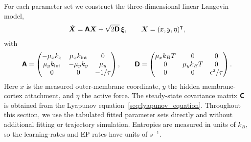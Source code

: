 For each parameter set we construct the three-dimensional linear Langevin model,
\[
\dot{\bm X} = \boldsymbol{\mathsf{A}} \bm X + \sqrt{2\boldsymbol{\mathsf{D}}}\,\bm\xi, \qquad \bm X = (x,y,\eta)^\intercal,
\]
with
\[
\boldsymbol{\mathsf{A}} =
\begin{pmatrix}
-\mu_x k_x & \mu_x k_{\rm int} & 0 \\
\mu_y k_{\rm int} & -\mu_y k_y & \mu_y \\
0 & 0 & -1/\tau
\end{pmatrix},
\qquad
\boldsymbol{\mathsf{D}} =
\begin{pmatrix}
\mu_x k_B T & 0 & 0 \\
0 & \mu_y k_B T & 0 \\
0 & 0 & \epsilon^2/\tau
\end{pmatrix}.
\]
Here $x$ is the measured outer-membrane coordinate, $y$ the hidden membrane-cortex attachment, and $\eta$ the active force. The steady-state covariance matrix $\boldsymbol{\mathsf{C}}$ is obtained from the Lyapunov equation~\eqref{seq:lyapunov_equation}.
Throughout this section, we use the tabulated fitted parameter sets directly and without additional fitting or trajectory simulation. Entropies are measured in units of $k_B$, so the learning-rates and EP rates have units of $s^{-1}$.

